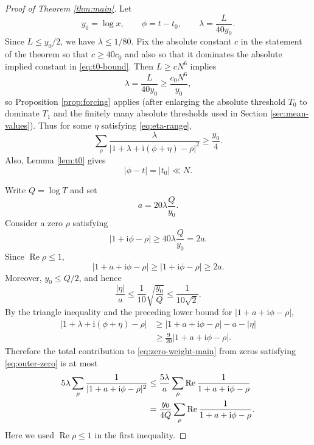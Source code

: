 \documentclass[12pt,reqno]{amsart}
\theoremstyle{remark}
\numberwithin{equation}{section}
\newcommand{\Ree}{\operatorname{Re}}
\newcommand{\ii}{\mathrm i}
\begin{document}
\begin{proof}[Proof of Theorem \ref{thm:main}]
Let
\[
y_0=\log x,
\qquad
\phi=t-t_0,
\qquad
\lambda=\frac{L}{40y_0}.
\]
Since $L\le y_0/2$, we have $\lambda\le1/80$.  Fix the absolute constant $c$ in the statement of the theorem so that $c\ge40c_0$ and also so that it dominates the absolute implied constant in \eqref{eq:t0-bound}.  Then $L\ge cN^6$ implies
\[
\lambda=\frac{L}{40y_0}\ge\frac{c_0N^6}{y_0},
\]
so Proposition \ref{prop:forcing} applies (after enlarging the absolute threshold $T_0$ to dominate $T_1$ and the finitely many absolute thresholds used in Section \ref{sec:mean-values}).  Thus for some $\eta$ satisfying \eqref{eq:eta-range},
\begin{equation}\label{eq:zero-weight-main}
\sum_\rho
\frac{\lambda}{|1+\lambda+\ii(\phi+\eta)-\rho|^2}
\ge\frac{y_0}{4}.
\end{equation}
Also, Lemma \ref{lem:t0} gives
\[
|\phi-t|=|t_0|\ll N.
\]

Write $Q=\log T$ and set
\[
a=20\lambda\frac{Q}{y_0}.
\]
Consider a zero $\rho$ satisfying
\begin{equation}\label{eq:outer-zero}
|1+\ii\phi-\rho|\ge40\lambda\frac{Q}{y_0}=2a.
\end{equation}
Since $\Ree\rho\le1$,
\[
|1+a+\ii\phi-\rho|\ge |1+\ii\phi-\rho|\ge2a.
\]
Moreover, $y_0\le Q/2$, and hence
\[
\frac{|\eta|}{a}
\le\frac1{10}\sqrt{\frac{y_0}{Q}}
\le\frac1{10\sqrt2}.
\]
By the triangle inequality and the preceding lower bound for $|1+a+\ii\phi-\rho|$,
\begin{align*}
|1+\lambda+\ii(\phi+\eta)-\rho|
&\ge |1+a+\ii\phi-\rho|-a-|\eta|\\
&\ge\frac9{20}|1+a+\ii\phi-\rho|.
\end{align*}
Therefore the total contribution to \eqref{eq:zero-weight-main} from zeros satisfying \eqref{eq:outer-zero} is at most
\begin{align}
5\lambda\sum_\rho\frac1{|1+a+\ii\phi-\rho|^2}
&\le \frac{5\lambda}{a}
\sum_\rho\Ree\frac1{1+a+\ii\phi-\rho} \notag\\
&=\frac{y_0}{4Q}
\sum_\rho\Ree\frac1{1+a+\ii\phi-\rho}.
\label{eq:outer-contribution}
\end{align}
Here we used $\Ree\rho\le1$ in the first inequality.


\end{proof}
\end{document}
